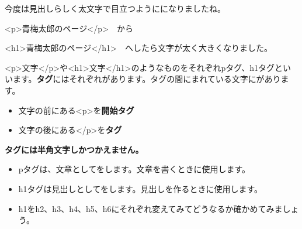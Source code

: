 \documentclass[a4paper,12pt]{jarticle}
\begin{document}
今度は見出しらしく太文字で目立つようにになりましたね。




\bigskip

{\textless}p{\textgreater}青梅太郎のページ{\textless}/p{\textgreater}　から

{\textless}h1{\textgreater}青梅太郎のページ{\textless}/h1{\textgreater}　へしたら文字が太く大きくなりました。


\bigskip

{\textless}p{\textgreater}文字{\textless}/p{\textgreater}や{\textless}h1{\textgreater}文字{\textless}/h1{\textgreater}のようなものをそれぞれpタグ、h1タグといいます。\textbf{タグ}にはそれぞれがあります。タグの間にまれている文字にがあります。

\begin{itemize}
  \item 文字の前にある{\textless}p{\textgreater}を\textbf{開始タグ}
  \item 文字の後にある{\textless}/p{\textgreater}を\textbf{タグ}
\end{itemize}

\textbf{タグには半角文字しかつかえません。}

\begin{itemize}
  \item pタグは、文章としてをします。文章を書くときに使用します。

  \item h1タグは見出しとしてをします。見出しを作るときに使用します。
\end{itemize}


\vfill

\theQuestion\label{Q:hasAnswer04-2}

\begin{itemize}
  \item[]
    h1をh2、h3、h4、h5、h6にそれぞれ変えてみてどうなるか確かめてみましょう。
\end{itemize}

\bigskip
\end{document}
